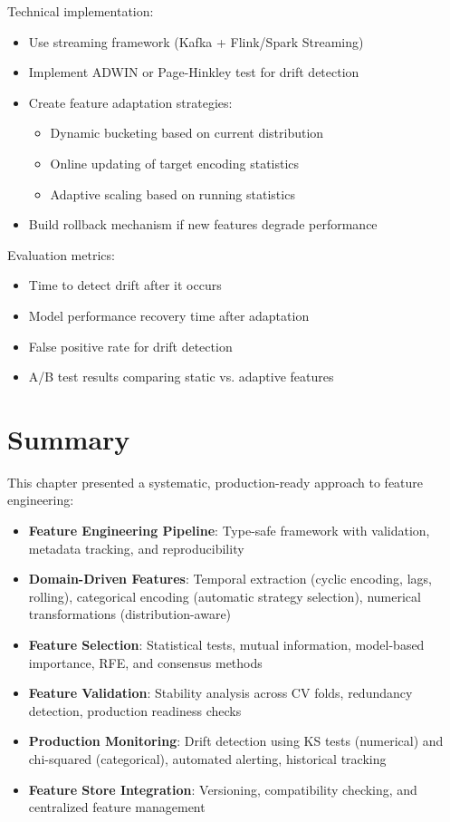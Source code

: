 Technical implementation:
\begin{itemize}
    \item Use streaming framework (Kafka + Flink/Spark Streaming)
    \item Implement ADWIN or Page-Hinkley test for drift detection
    \item Create feature adaptation strategies:
    \begin{itemize}
        \item Dynamic bucketing based on current distribution
        \item Online updating of target encoding statistics
        \item Adaptive scaling based on running statistics
    \end{itemize}
    \item Build rollback mechanism if new features degrade performance
\end{itemize}

Evaluation metrics:
\begin{itemize}
    \item Time to detect drift after it occurs
    \item Model performance recovery time after adaptation
    \item False positive rate for drift detection
    \item A/B test results comparing static vs. adaptive features
\end{itemize}

\section{Summary}

This chapter presented a systematic, production-ready approach to feature engineering:

\begin{itemize}
    \item \textbf{Feature Engineering Pipeline}: Type-safe framework with validation, metadata tracking, and reproducibility
    \item \textbf{Domain-Driven Features}: Temporal extraction (cyclic encoding, lags, rolling), categorical encoding (automatic strategy selection), numerical transformations (distribution-aware)
    \item \textbf{Feature Selection}: Statistical tests, mutual information, model-based importance, RFE, and consensus methods
    \item \textbf{Feature Validation}: Stability analysis across CV folds, redundancy detection, production readiness checks
    \item \textbf{Production Monitoring}: Drift detection using KS tests (numerical) and chi-squared (categorical), automated alerting, historical tracking
    \item \textbf{Feature Store Integration}: Versioning, compatibility checking, and centralized feature management
\end{itemize}

